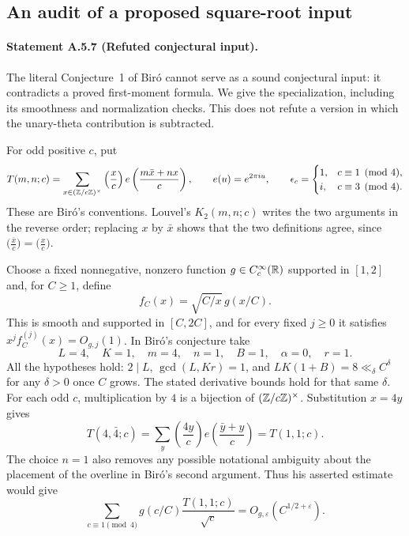 \subsection{An audit of a proposed square-root input}
\paragraph{Statement A.5.7 (Refuted conjectural input).}
The literal Conjecture~1 of Bir\'o \cite{A5Biro2026} cannot serve as a
sound conjectural input: it contradicts a proved first-moment formula.
We give the specialization, including its smoothness and normalization
checks.  This does not refute a version in which the unary-theta
contribution is subtracted.

For odd positive $c$, put
\[
 T(m,n;c)=\sum_{x\in(\mathbb Z/c\mathbb Z)^\times}
 \left(\frac{x}{c}\right)e\left(\frac{m\bar x+nx}{c}\right),
 \qquad e(u)=e^{2\pi i u},
 \qquad
 \epsilon_c=\begin{cases}1,&c\equiv1\pmod4,\\
                         i,&c\equiv3\pmod4.
            \end{cases}
\]
These are Bir\'o's conventions.  Louvel's $K_2(m,n;c)$ writes the two
arguments in the reverse order; replacing $x$ by $\bar x$ shows that
the two definitions agree, since
$\bigl(\frac{\bar x}{c}\bigr)=\bigl(\frac{x}{c}\bigr)$.

Choose a fixed nonnegative, nonzero function
$g\in C_c^\infty(\mathbb R)$ supported in $[1,2]$ and, for $C\geq1$, define
\[
 f_C(x)=\sqrt{C/x}\,g(x/C).
\]
This is smooth and supported in $[C,2C]$, and for every fixed
$j\geq0$ it satisfies
$x^j f_C^{(j)}(x)=O_{g,j}(1)$.
In Bir\'o's conjecture take
\[
 L=4,\quad K=1,\quad m=4,\quad n=1,
 \quad B=1,\quad\alpha=0,
 \quad r=1.
\]
All the hypotheses hold: $2\mid L$,
$\gcd(L,Kr)=1$, and $LK(1+B)=8\ll_\delta C^\delta$
for any $\delta>0$ once $C$ grows.  The stated derivative bounds hold
for that same $\delta$.  For each odd $c$, multiplication by $4$ is a
bijection of $(\mathbb Z/c\mathbb Z)^\times$.  Substitution $x=4y$ gives
\[
 T(4,\bar4;c)
 =\sum_y\left(\frac{4y}{c}\right)
 e\left(\frac{\bar y+y}{c}\right)
 =T(1,1;c).
\]
The choice $n=1$ also removes any possible notational ambiguity about
the placement of the overline in Bir\'o's second argument.
Thus his asserted estimate would give
\[
 \sum_{c\equiv1\pmod4}
 g(c/C)\frac{T(1,1;c)}{\sqrt c}
 =O_{g,\varepsilon}(C^{1/2+\varepsilon}).
\]

